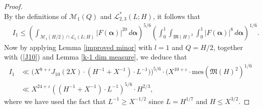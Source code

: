 \documentclass[10pt,a4paper]{amsart}
\newcommand{\balp}{\boldsymbol{\alpha}}
\begin{document}
\begin{proof}
\begin{equation}
\end{equation}
By the definitions of $\mathcal{M}_1(Q)$ and $\mathcal{L}^*_{2,3}(L;H)$, it follows that
\begin{equation}\label{mean value over the secondary minor arcs2}
    \begin{aligned}
     & I_1 \le \left(\int_{\mathcal{M}_1(H/2)\cap  \mathcal{L}_{1}(L;H)}|F(\boldsymbol{\alpha})|^{20}\, d\balp\right)^{5/6}\left(\int_0^1\int_{\mathfrak{M}(H)^2}\int_0^1|F(\boldsymbol{\alpha})|^{8}\, d\balp\right)^{1/6}.
    \end{aligned}
\end{equation}
Now by applying Lemma \ref{improved minor} with $l=1$ and $Q=H/2$, together with (\ref{J10}) and Lemma \ref{k-1 dim measure}, we deduce that
\begin{equation}\label{final bound 1}
    \begin{aligned}
         I_1  &\ll \bigl(X^{8+\varepsilon}J_{10}(2X)\cdot \left(H^{-1}+X^{-1}\right)\cdot L^{-1}\bigr)\bigr)^{5/6}\cdot (X^{10+\varepsilon}\cdot \text{mes}(\mathfrak{M}(H)^2)^{1/6}\\
   & \ll X^{24+\varepsilon}\left(\left(H^{-1}+X^{-1}\right)\cdot L^{-1}\right)^{5/6}\cdot H^{2/3},
    \end{aligned}
\end{equation}
where we have used the fact that $L^{-1}\geq X^{-1/2}$ since $L=H^{1/7}$ and $H\leq X^{3/2}.$


\end{proof}
\end{document}
